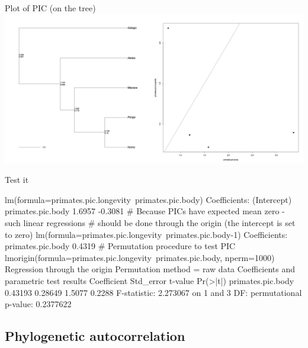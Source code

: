 \documentclass[compress, ucs, xelatex, 11pt, xcolor=svgnames,
  hyperref={
    bookmarks=true,
    unicode=true,
    colorlinks=true,
    pdftitle={Molecular data in R},
    plainpages=false,
    pdfauthor={Vojtech Zeisek},
    pdfsubject={Course about phylogeny and evolution in R},
    pdfcreator={XeLaTeX},
    pdfkeywords={R, evolution, phylogeny, molecular data},
    linkcolor=Tomato,
    anchorcolor=SaddleBrown,
    citecolor=Goldenrod,
    filecolor=DarkMagenta,
    menucolor=Sienna,
    urlcolor=DarkTurquoise,
    pdftex},
  url={hyphens, lowtilde} %
  ]{beamer}
\begin{document}
\begin{frame}{Plot of PIC (on the tree)}
\includegraphics[width=\textwidth]{pic.png}
\end{frame}

\begin{frame}[fragile]{Test it}
  \begin{spluscode}
    lm(formula=primates.pic.longevity~primates.pic.body)
    Coefficients:
      (Intercept)  primates.pic.body
           1.6957            -0.3081
    # Because PICs have expected mean zero - such linear regressions
    # should be done through the origin (the intercept is set to zero)
    lm(formula=primates.pic.longevity~primates.pic.body-1)
    Coefficients:
    primates.pic.body
               0.4319
    # Permutation procedure to test PIC
    lmorigin(formula=primates.pic.longevity~primates.pic.body, nperm=1000)
    Regression through the origin
    Permutation method = raw data
    Coefficients and parametric test results
                       Coefficient Std_error t-value Pr(>|t|)
    primates.pic.body     0.43193   0.28649  1.5077   0.2288
    F-statistic: 2.273067 on 1 and 3 DF:
      permutational p-value: 0.2377622
  \end{spluscode}
\end{frame}

\subsection{Phylogenetic autocorrelation}
\end{document}
